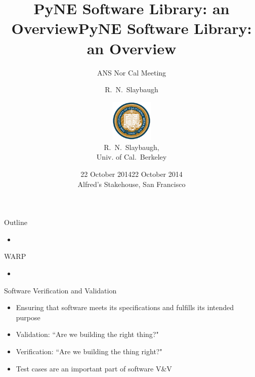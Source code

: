 \documentclass{beamer}
\title{PyNE Software Library: an Overview}
\author{R.\ N.\ Slaybaugh}
\date{22 October 2014}
\renewcommand{\(}{\begin{columns}}
\renewcommand{\)}{\end{columns}}
\newcommand{\<}[1]{\begin{column}{#1}}
\renewcommand{\>}{\end{column}}
\begin{document}
\begin{frame}
\title{PyNE Software Library: an Overview}
\subtitle{ANS Nor Cal Meeting}
\author{
        \includegraphics[height=2cm]{../bk}\\R.\ N.\ Slaybaugh, \\ Univ. of Cal.\ Berkeley}

\date{22 October 2014\\ Alfred's Stakehouse, San Francisco}
\titlepage
\end{frame}


\begin{frame}{Outline}
	\begin{itemize}
    \item
	\end{itemize}
\end{frame}

\begin{frame}{WARP \cite{pyne}}
	\begin{itemize}
	\item
	\end{itemize}
\end{frame}

\begin{frame}{Software Verification and Validation}
	\begin{itemize}
	\pause
	\item{Ensuring that software meets its specifications and fulfills its intended purpose}
	\pause
	\item{Validation: ``Are we building the right thing?"}
	\pause
	\item{Verification: ``Are we building the thing right?"}
	\pause
	\item{Test cases are an important part of software V\&V}
	\end{itemize}
\end{frame}



\end{document}
